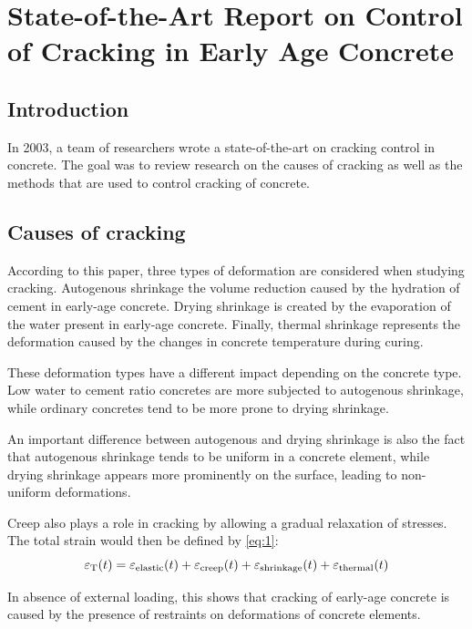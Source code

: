 \documentclass[a4paper,11pt]{memoir}
\begin{document}
\section[State-of-the-Art Report on Control of Cracking in Early Age Concrete]
{State-of-the-Art Report on Control of Cracking in Early Age Concrete \cite{soa}}

\subsection{Introduction}
In 2003, a team of researchers wrote a state-of-the-art on cracking control in
concrete. The goal was to review research on the causes of cracking as well as
the methods that are used to control cracking of concrete.

\subsection{Causes of cracking}
According to this paper, three types of deformation are considered when
studying cracking. Autogenous shrinkage the volume reduction
caused by the hydration of cement in early-age concrete. Drying shrinkage is
created by the evaporation of the water present in early-age concrete. Finally,
thermal shrinkage represents the deformation caused by the changes in concrete
temperature during curing.

These deformation types have a different impact depending on the concrete type.
Low water to cement ratio concretes are more subjected to autogenous shrinkage, while
ordinary concretes tend to be more prone to drying shrinkage.

An important difference between autogenous and drying shrinkage is also the
fact that autogenous shrinkage tends to be uniform in a concrete element, while
drying shrinkage appears more prominently on the surface, leading to non-uniform
deformations.

Creep also plays a role in cracking by allowing a gradual relaxation of
stresses. The total strain would then be defined by \autoref{eq:1}:
\begin{equation}
  \epsilon_{\text T}(t) =
  \epsilon_{\text{elastic}}(t) +
  \epsilon_{\text{creep}}(t) +
  \epsilon_{\text{shrinkage}}(t) +
  \epsilon_{\text{thermal}}(t)
  \label{eq:1}
\end{equation}

In absence of external loading, this shows that cracking of early-age concrete
is caused by the presence of restraints on deformations of concrete elements.
\end{document}
